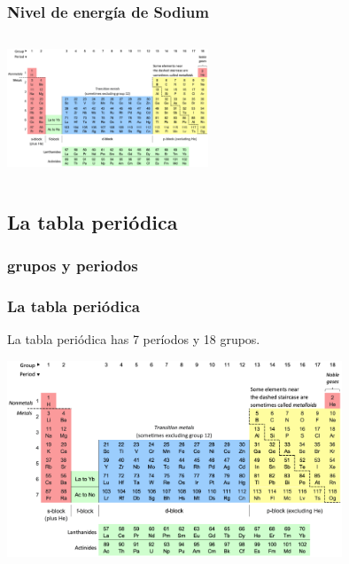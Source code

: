 \documentclass{beamer}
\begin{document}
\begin{frame}
    \frametitle{Nivel de energía de Sodium}
    \begin{columns}
        
        \begin{column}{0.5\textwidth}
            \includegraphics[width=6cm]{../../../../public/images/pTable.png}
            
        \end{column}
        \begin{column}{0.5\textwidth}
            
        \end{column}
    \end{columns}

\end{frame}



\subsection{La tabla periódica}

\subsubsection{grupos y periodos}

\begin{frame}
    \frametitle{La tabla periódica}

    \onslide La tabla periódica has
    \pause \alert{7}
    \onslide períodos y
    \pause \alert{18}
    \onslide grupos.
    
    \includegraphics[width=10cm]{../../../../public/images/pTable.png}

\end{frame}
\end{document}
